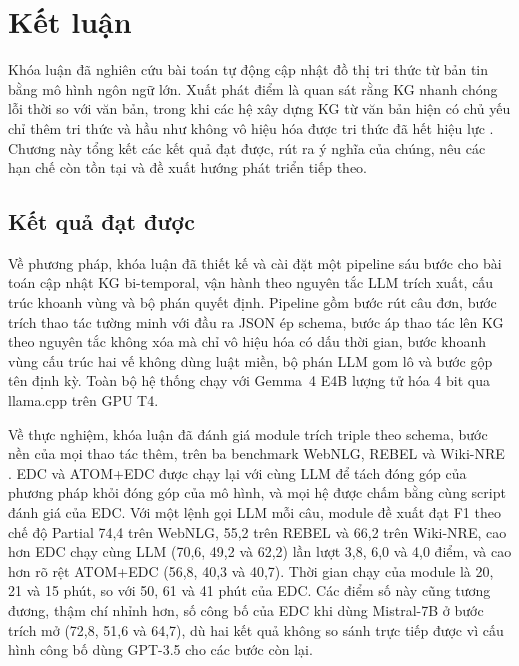 \chapter{Kết luận}
\label{chap:conclusion}

Khóa luận đã nghiên cứu bài toán tự động cập nhật đồ thị tri thức từ bản tin bằng mô hình ngôn ngữ lớn.
Xuất phát điểm là quan sát rằng KG nhanh chóng lỗi thời so với văn bản,
trong khi các hệ xây dựng KG từ văn bản hiện có chủ yếu chỉ thêm tri thức
và hầu như không vô hiệu hóa được tri thức đã hết hiệu lực \cite{zaporojets2025emerge}.
Chương này tổng kết các kết quả đạt được, rút ra ý nghĩa của chúng,
nêu các hạn chế còn tồn tại và đề xuất hướng phát triển tiếp theo.

\section{Kết quả đạt được}
\label{sec:conclusion-results}

Về phương pháp, khóa luận đã thiết kế và cài đặt một pipeline sáu bước cho bài toán cập nhật KG bi-temporal,
vận hành theo nguyên tắc LLM trích xuất, cấu trúc khoanh vùng và bộ phán quyết định.
Pipeline gồm bước rút câu đơn, bước trích thao tác tường minh với đầu ra JSON ép schema,
bước áp thao tác lên KG theo nguyên tắc không xóa mà chỉ vô hiệu hóa có dấu thời gian,
bước khoanh vùng cấu trúc hai vế không dùng luật miền, bộ phán LLM gom lô và bước gộp tên định kỳ.
Toàn bộ hệ thống chạy với Gemma~4 E4B lượng tử hóa 4 bit \cite{gemma4} qua llama.cpp \cite{llamacpp} trên GPU T4.

Về thực nghiệm, khóa luận đã đánh giá module trích triple theo schema,
bước nền của mọi thao tác thêm, trên ba benchmark WebNLG, REBEL và Wiki-NRE \cite{zhang2024edc,cabot2021rebel}.
EDC \cite{zhang2024edc} và ATOM+EDC \cite{lairgi2025atom} được chạy lại với cùng LLM
để tách đóng góp của phương pháp khỏi đóng góp của mô hình,
và mọi hệ được chấm bằng cùng script đánh giá của EDC.
Với một lệnh gọi LLM mỗi câu, module đề xuất đạt F1 theo chế độ Partial 74,4 trên WebNLG, 55,2 trên REBEL và 66,2 trên Wiki-NRE,
cao hơn EDC chạy cùng LLM (70,6, 49,2 và 62,2) lần lượt 3,8, 6,0 và 4,0 điểm,
và cao hơn rõ rệt ATOM+EDC (56,8, 40,3 và 40,7).
Thời gian chạy của module là 20, 21 và 15 phút, so với 50, 61 và 41 phút của EDC.
Các điểm số này cũng tương đương, thậm chí nhỉnh hơn, số công bố của EDC khi dùng Mistral-7B ở bước trích mở (72,8, 51,6 và 64,7),
dù hai kết quả không so sánh trực tiếp được vì cấu hình công bố dùng GPT-3.5 cho các bước còn lại.

